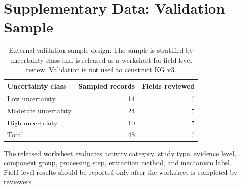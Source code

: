\documentclass[11pt]{article}
\begin{document}
\section{Supplementary Data: Validation Sample}
\label{app:validation}

\begin{table}[htbp]
\centering
\small
\caption{External validation sample design. The sample is stratified by uncertainty class and is released as a worksheet for field-level review. Validation is not used to construct KG v3.}
\label{tab:validation_sample}
\begin{tabular}{lrr}
\toprule
Uncertainty class & Sampled records & Fields reviewed \\
\midrule
Low uncertainty & 14 & 7 \\
Moderate uncertainty & 24 & 7 \\
High uncertainty & 10 & 7 \\
\midrule
Total & 48 & 7 \\
\bottomrule
\end{tabular}
\end{table}

The released worksheet evaluates activity category, study type, evidence level, component group, processing step, extraction method, and mechanism label. Field-level results should be reported only after the worksheet is completed by reviewers.



\end{document}
